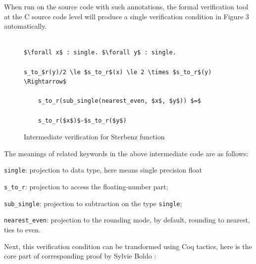 \documentclass[10pt, conference, compsocconf]{IEEEtran}
\begin{document}
When run on the source code with such annotations, the formal verification tool at the C source code level will produce a single verification condition in Figure 3 automatically.

\begin{figure}[H]
\begin{lstlisting}[label=intermediate]

$\forall x$ : single. $\forall y$ : single.

s_to_$r(y)/2 \le $s_to_r$(x) \le 2 \times $s_to_r$(y) \Rightarrow$

    s_to_r(sub_single(nearest_even, $x$, $y$)) $=$ 

    s_to_r($x$)$-$s_to_r($y$)

\end{lstlisting}    
\caption{Intermediate verification for Sterbenz function}
\end{figure}



The meanings of related keywords in the above intermediate code are as follows:

\texttt{single}: projection to data type, here means single precision float

\texttt{s\_to\_r}: projection to access the floating-number part;

\texttt{sub\_single}: projection to subtraction on the type \texttt{single};

\texttt{nearest\_even}: projection to the rounding mode, by default, rounding to nearest, ties to even.

Next, this verification condition can be transformed using Coq tactics, here is the core part of corresponding proof by Sylvie Boldo \cite{Boldo}:
\end{document}

